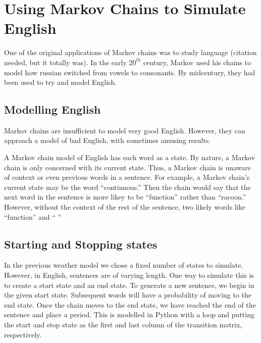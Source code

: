 \section*{Using Markov Chains to Simulate English}

One of the original applications of Markov chains was to study language (citation needed, but it totally was).
In the early $20^{th}$ century, Markov used his chains to model how russian switched from vowels to consonants.
By midcentury, they had been used to try and model English.

\subsection*{Modelling English}
Markov chains are insufficient to model very good English.
However, they can approach a model of bad English, with sometimes amusing results.

A Markov chain model of English has each word as a state.
By nature, a Markov chain is only concerned with its current state.
Thus, a Markov chain is unaware of context or even previous words in a sentence.
For example, a Markov chain's current state may be the word ``continuous.''
Then the chain would say that the next word in the sentence is more likey to be ``function'' rather than ``racoon.''
However, without the context of the rest of the sentence, two likely words like ``function'' and `` ''

\subsection*{Starting and Stopping states}

In the previous weather model we chose a fixed number of states to simulate.
However, in English, sentences are of varying length.
One way to simulate this is to create a start state and an end state.
To generate a new sentence, we begin in the given start state.
Subsequent words will have a probability of moving to the end state.
Once the chain moves to the end state, we have reached the end of the sentence and place a period.
This is modelled in Python with a  loop and putting the start and stop state as the first and last column of the transition matrix, respectively.

